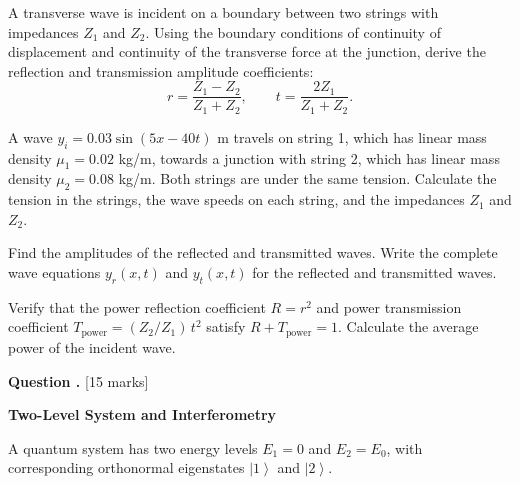 \documentclass[12pt,a4paper]{article}
\newcounter{questioncounter}
\newcommand{\question}[1]{%
  \stepcounter{questioncounter}%
  \vspace{0.5cm}%
  \noindent\textbf{Question \thequestioncounter.} \hfill [#1 marks]%
  \vspace{0.2cm}%
  \par%
}
\renewcommand{\ket}[1]{\left|#1\right\rangle}
\begin{document}
\begin{parts}
\item A transverse wave is incident on a boundary between two strings with impedances $Z_1$ and $Z_2$. Using the boundary conditions of continuity of displacement and continuity of the transverse force at the junction, derive the reflection and transmission amplitude coefficients:
\[
r = \frac{Z_1 - Z_2}{Z_1 + Z_2}, \qquad t = \frac{2Z_1}{Z_1 + Z_2}.
\]

\item A wave $y_i = 0.03\sin(5x - 40t)$ m travels on string 1, which has linear mass density $\mu_1 = 0.02$ kg/m, towards a junction with string 2, which has linear mass density $\mu_2 = 0.08$ kg/m. Both strings are under the same tension. Calculate the tension in the strings, the wave speeds on each string, and the impedances $Z_1$ and $Z_2$. 

\item Find the amplitudes of the reflected and transmitted waves. Write the complete wave equations $y_r(x,t)$ and $y_t(x,t)$ for the reflected and transmitted waves. 

\item Verify that the power reflection coefficient $R = r^2$ and power transmission coefficient $T_{\text{power}} = (Z_2/Z_1)\,t^2$ satisfy $R + T_{\text{power}} = 1$. Calculate the average power of the incident wave. 
\end{parts}

\newpage

\question{15}

\noindent\textbf{Two-Level System and Interferometry}

\noindent A quantum system has two energy levels $E_1 = 0$ and $E_2 = E_0$, with corresponding orthonormal eigenstates $\ket{1}$ and $\ket{2}$.
\end{document}
